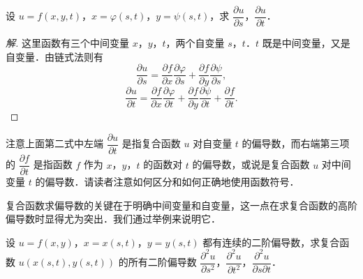 \begin{example}\label{ex:16-2-2}
设 $u=f(x,y,t)$，$x=\varphi(s,t)$，$y=\psi(s,t)$，求 $\dfrac{\partial u}{\partial s}$，$\dfrac{\partial u}{\partial t}$．
\end{example}

\begin{proof}[解]
这里函数有三个中间变量 $x$，$y$，$t$，两个自变量 $s$，$t$．$t$ 既是中间变量，又是自变量．由链式法则有
\[
\frac{\partial u}{\partial s}=\frac{\partial f}{\partial x}\frac{\partial\varphi}{\partial s}+\frac{\partial f}{\partial y}\frac{\partial\psi}{\partial s},
\]
\[
\frac{\partial u}{\partial t}=\frac{\partial f}{\partial x}\frac{\partial\varphi}{\partial t}+\frac{\partial f}{\partial y}\frac{\partial\psi}{\partial t}+\frac{\partial f}{\partial t}.
\]
\end{proof}

注意上面第二式中左端 $\dfrac{\partial u}{\partial t}$ 是指复合函数 $u$ 对自变量 $t$ 的偏导数，而右端第三项的 $\dfrac{\partial f}{\partial t}$ 是指函数 $f$ 作为 $x$，$y$，$t$ 的函数对 $t$ 的偏导数，或说是复合函数 $u$ 对中间变量 $t$ 的偏导数．请读者注意如何区分和如何正确地使用函数符号．

复合函数求偏导数的关键在于明确中间变量和自变量，这一点在求复合函数的高阶偏导数时显得尤为突出．我们通过举例来说明它．

\begin{example}\label{ex:16-2-3}
设 $u=f(x,y)$，$x=x(s,t)$，$y=y(s,t)$ 都有连续的二阶偏导数，求复合函数 $u(x(s,t),y(s,t))$ 的所有二阶偏导数 $\dfrac{\partial^{2}u}{\partial s^{2}}$，$\dfrac{\partial^{2}u}{\partial t^{2}}$，$\dfrac{\partial^{2}u}{\partial s\partial t}$．
\end{example}

